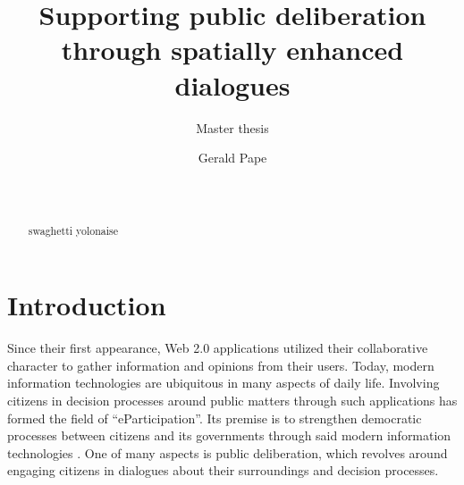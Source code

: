\documentclass{sigchi}
\begin{document}
\title{Supporting public deliberation\\through spatially enhanced dialogues}
\subtitle{Master thesis}

\author{
  \alignauthor Gerald Pape\\
    \\
    \\
}

\maketitle

\begin{abstract}
swaghetti yolonaise
\end{abstract}




\section{Introduction}
Since their first appearance, Web 2.0 applications utilized their collaborative character to gather information and opinions from their users. Today, modern information technologies are ubiquitous in many aspects of daily life. Involving citizens in decision processes around public matters through such applications has formed the field of ``eParticipation''. Its premise is to strengthen democratic processes between citizens and its governments through said modern information technologies \cite{Saebo_eParticipation, Medaglia2012_eParticipation}. One of many aspects is public deliberation, which revolves around engaging citizens in dialogues about their surroundings and decision processes.
\end{document}
